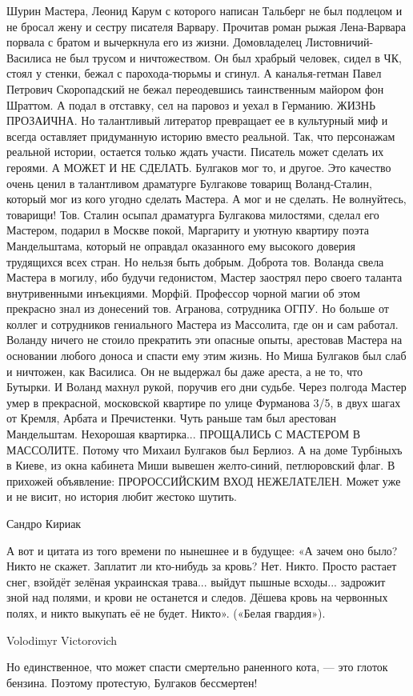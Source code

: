Шурин Мастера, Леонид Карум с которого написан Тальберг не был подлецом и не бросал жену и сестру писателя Варвару. Прочитав роман рыжая Лена-Варвара порвала с братом и вычеркнула его из жизни. 
Домовладелец Листовничий-Василиса не был трусом и ничтожеством. Он был храбрый человек, сидел в ЧК, стоял у стенки, бежал с парохода-тюрьмы и сгинул.
А каналья-гетман Павел Петрович Скоропадский не бежал переодевшись таинственным майором фон Шраттом. А подал в отставку, сел на паровоз и уехал в Германию.
ЖИЗНЬ ПРОЗАИЧНА.
Но талантливый литератор превращает ее в культурный миф и всегда оставляет придуманную историю вместо реальной. Так, что персонажам реальной истории, остается только ждать участи. Писатель может сделать их героями.
А МОЖЕТ И НЕ СДЕЛАТЬ.
Булгаков мог то, и другое. Это качество очень ценил в талантливом драматурге Булгакове товарищ Воланд-Сталин, который мог из кого угодно сделать Мастера. А мог и не сделать. Не волнуйтесь, товарищи! Тов. Сталин осыпал драматурга Булгакова милостями, сделал его Мастером, подарил в Москве покой, Маргариту и уютную квартиру поэта Мандельштама, который не оправдал оказанного ему высокого доверия трудящихся всех стран. Но нельзя быть добрым. Доброта тов. Воланда свела Мастера в могилу, ибо будучи гедонистом, Мастер заострял перо своего таланта внутривенными инъекциями. Морфiй. Профессор чорной магии об этом прекрасно знал из донесений тов. Агранова, сотрудника ОГПУ. Но больше от коллег и сотрудников гениального Мастера из Массолита, где он и сам работал. Воланду ничего не стоило прекратить эти опасные опыты, арестовав Мастера на основании любого доноса и спасти ему этим жизнь. Но Миша Булгаков был слаб и ничтожен, как Василиса. Он не выдержал бы даже ареста, а не то, что Бутырки. И Воланд махнул рукой, поручив его дни судьбе. Через полгода Мастер умер в прекрасной, московской квартире по улице Фурманова 3/5, в двух шагах от Кремля, Арбата и Пречистенки. Чуть раньше там был арестован Мандельштам. 
Нехорошая квартирка...
ПРОЩАЛИСЬ С МАСТЕРОМ В МАССОЛИТЕ.
Потому что Михаил Булгаков был Берлиоз.
А на доме Турбiныхъ в Киеве, из окна кабинета Миши вывешен желто-синий, петлюровский флаг. В прихожей объявление:
ПРОРОССИЙСКИМ ВХОД НЕЖЕЛАТЕЛЕН.
Может уже и не висит, но история любит жестоко шутить.

Сандро Кириак

А вот и цитата из того времени по нынешнее и в будущее:
«А зачем оно было? Никто не скажет. Заплатит ли кто-нибудь за кровь? Нет. Никто. Просто растает снег, взойдёт зелёная украинская трава... выйдут пышные всходы... задрожит зной над полями, и крови не останется и следов. Дёшева кровь на червонных полях, и никто выкупать её не будет. Никто».
(«Белая гвардия»).

Volodimyr Victorovich

Но единственное, что может спасти смертельно раненного кота, — это глоток
бензина. Поэтому протестую, Булгаков бессмертен!
